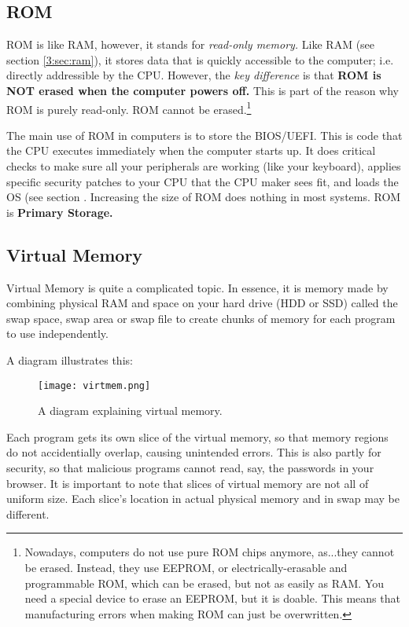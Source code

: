 \documentclass[../main.tex]{subfiles}
\begin{document}
\subsection{ROM}

ROM is like RAM, however, it stands for \emph{read-only memory.} Like RAM (see section \ref{3:sec:ram}), it stores data that is quickly accessible to the computer; i.e. directly addressible by the CPU. However, the \emph{key difference} is that \textbf{ROM is NOT erased when the computer powers off.} This is part of the reason why ROM is purely read-only. ROM cannot be erased.\footnote{Nowadays, computers do not use pure ROM chips anymore, as...they cannot be erased. Instead, they use EEPROM, or electrically-erasable and programmable ROM, which can be erased, but not as easily as RAM. You need a special device to erase an EEPROM, but it is doable. This means that manufacturing errors when making ROM can just be overwritten.}

The main use of ROM in computers is to store the BIOS/UEFI. This is code that the CPU executes immediately when the computer starts up. It does critical checks to make sure all your peripherals are working (like your keyboard), applies specific security patches to your CPU that the CPU maker sees fit, and loads the OS (see section \label{4:sec:the_os_and_kernel}. Increasing the size of ROM does nothing in most systems. ROM is \textbf{Primary Storage.}

\subsection{Virtual Memory}
\label{3:sec:virtmem}

Virtual Memory is quite a complicated topic. In essence, it is memory made by combining physical RAM and space on your hard drive (HDD or SSD) called the swap space, swap area or swap file to create chunks of memory for each program to use independently.

A diagram illustrates this:

\begin{figure}[H]
    \centering
    \texttt{[image: virtmem.png]}
    \caption{A diagram explaining virtual memory.}
    \label{fig:virtmem}
\end{figure}

Each program gets its own slice of the virtual memory, so that memory regions do not accidentially overlap, causing unintended errors. This is also partly for security, so that malicious programs cannot read, say, the passwords in your browser. It is important to note that slices of virtual memory are not all of uniform size. Each slice's location in actual physical memory and in swap may be different.
\end{document}
